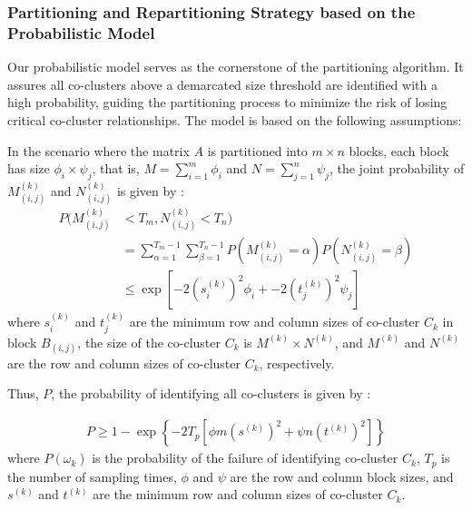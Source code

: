 \documentclass[journal]{IEEEtran}
\begin{document}
\subsubsection{Partitioning and Repartitioning Strategy based on the Probabilistic Model}

Our probabilistic model serves as the cornerstone of the partitioning algorithm. It assures all co-clusters above a demarcated size threshold are identified with a high probability, guiding the partitioning process to minimize the risk of losing critical co-cluster relationships. The model is based on the following assumptions:

In the scenario where the matrix $A$ is partitioned into $m \times n$ blocks, each block has size $\phi_i \times \psi_j$, that is, $M=\sum_{i=1}^m \phi_i$ and $N=\sum_{j=1}^n \psi_j$, the joint probability of $M_{(i,j)}^{(k)}$ and $N_{(i,j)}^{(k)}$ is given by :
\begin{equation}
  \begin{split}
    P(M_{(i,j)}^{(k)} & < T_m, N_{(i,j)}^{(k)} < T_n)                                                                           \\
                      & = \sum_{\alpha=1}^{T_m-1} \sum_{\beta=1}^{T_n-1} P(M_{(i,j)}^{(k)} = \alpha) P(N_{(i,j)}^{(k)} = \beta) \\
                      & \le \exp[-2 (s_i^{(k)})^2 \phi_i + -2 (t_j^{(k)})^2 \psi_j]
  \end{split}
\end{equation}
where $s_i^{(k)}$ and $t_j^{(k)}$ are the minimum row and column sizes of co-cluster $C_k$ in block $B_{(i,j)}$, the size of the co-cluster $C_k$ is $M^{(k)} \times N^{(k)}$, and $M^{(k)}$ and $N^{(k)}$ are the row and column sizes of co-cluster $C_k$, respectively.

Thus, $P$, the probability of identifying all co-clusters is given by :

\begin{equation}
  \begin{split}
    P \ge 1 - \exp \left\{ -2 T_p [\phi m (s^{(k)})^2 + \psi n (t^{(k)})^2] \right\} \label{eq:prob_of_identifying_all_co_clusters}
  \end{split}
\end{equation}
where $P(\omega_k)$ is the probability of the failure of identifying co-cluster $C_k$, $T_p$ is the number of sampling times, $\phi$ and $\psi$ are the row and column block sizes, and $s^{(k)}$ and $t^{(k)}$ are the minimum row and column sizes of co-cluster $C_k$.
\end{document}
